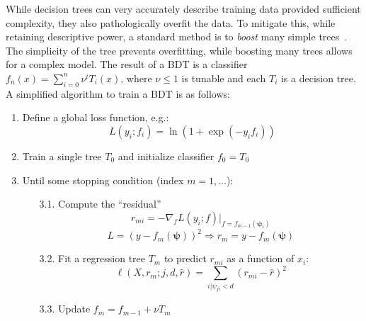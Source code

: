 While decision trees can very accurately describe training data provided sufficient complexity, they also pathologically overfit the data.
To mitigate this, while retaining descriptive power, a standard method is to \emph{boost} many simple trees~\needcite.
The simplicity of the tree prevents overfitting, while boosting many trees allows for a complex model.
The result of a BDT is a classifier $f_n(x) = \sum_{i=0}^n \nu^i T_i(x)$, where $\nu\leq 1$ is tunable and each $T_i$ is a decision tree. 
A simplified algorithm to train a BDT is as follows:
\begin{enumerate}
    \item Define a global loss function, e.g.:
        \begin{equation} L(y_i; f_i) = \ln\left(1 + \exp(-y_if_i)\right)\end{equation}
    \item Train a single tree $T_0$ and initialize classifier $f_0 = T_0$
    \item Until some stopping condition (index $m=1,\dots$):
    \begin{enumerate}
      \item[3.1.] Compute the ``residual''
        \begin{equation}r_{mi} = -\nabla_f L(y_i; f) |_{f=f_{m-1}(\bm\psi_i)}\end{equation}
        \begin{equation}L = (y-f_m(\bm\psi))^2 \Rightarrow r_m = y - f_m(\bm\psi) \end{equation}
      \item[3.2.] Fit a regression tree $T_m$ to predict $r_{mi}$ as a function of $x_i$:
        \begin{equation}\ell(X,r_m;j,d,\hat{r}) = \sum_{i | \psi_{ji} < d} (r_{mi} - \hat r)^2\end{equation}
      \item[3.3.] Update $f_m = f_{m-1} + \nu T_m$
    \end{enumerate}
\end{enumerate}

